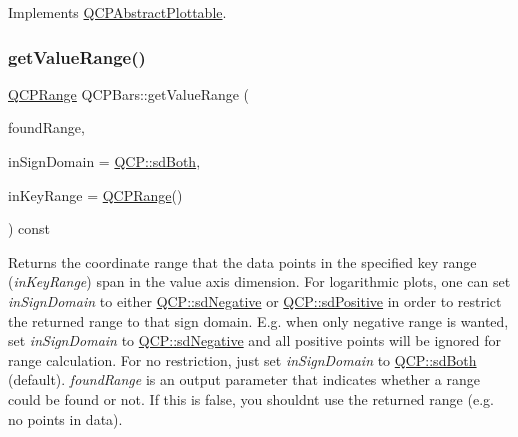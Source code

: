 Implements \hyperlink{classQCPAbstractPlottable_a4da16d3cd4b509e1104a9b0275623c96}{Q\+C\+P\+Abstract\+Plottable}.

\mbox{\label{classQCPBars_a02cee4bf94d48a1e5f6fc185d9a10477}} 
\subsubsection{\texorpdfstring{get\+Value\+Range()}{getValueRange()}}
{\footnotesize\ttfamily \hyperlink{classQCPRange}{Q\+C\+P\+Range} Q\+C\+P\+Bars\+::get\+Value\+Range (\begin{DoxyParamCaption}\item[{bool \&}]{found\+Range,  }\item[{\hyperlink{namespaceQCP_afd50e7cf431af385614987d8553ff8a9}{Q\+C\+P\+::\+Sign\+Domain}}]{in\+Sign\+Domain = {\ttfamily \hyperlink{namespaceQCP_afd50e7cf431af385614987d8553ff8a9aa38352ef02d51ddfa4399d9551566e24}{Q\+C\+P\+::sd\+Both}},  }\item[{const \hyperlink{classQCPRange}{Q\+C\+P\+Range} \&}]{in\+Key\+Range = {\ttfamily \hyperlink{classQCPRange}{Q\+C\+P\+Range}()} }\end{DoxyParamCaption}) const\hspace{0.3cm}{\ttfamily [virtual]}}

Returns the coordinate range that the data points in the specified key range ({\itshape in\+Key\+Range}) span in the value axis dimension. For logarithmic plots, one can set {\itshape in\+Sign\+Domain} to either \hyperlink{namespaceQCP_afd50e7cf431af385614987d8553ff8a9a2d18af0bc58f6528d1e82ce699fe4829}{Q\+C\+P\+::sd\+Negative} or \hyperlink{namespaceQCP_afd50e7cf431af385614987d8553ff8a9a584784b75fb816abcc627cf743bb699f}{Q\+C\+P\+::sd\+Positive} in order to restrict the returned range to that sign domain. E.\+g. when only negative range is wanted, set {\itshape in\+Sign\+Domain} to \hyperlink{namespaceQCP_afd50e7cf431af385614987d8553ff8a9a2d18af0bc58f6528d1e82ce699fe4829}{Q\+C\+P\+::sd\+Negative} and all positive points will be ignored for range calculation. For no restriction, just set {\itshape in\+Sign\+Domain} to \hyperlink{namespaceQCP_afd50e7cf431af385614987d8553ff8a9aa38352ef02d51ddfa4399d9551566e24}{Q\+C\+P\+::sd\+Both} (default). {\itshape found\+Range} is an output parameter that indicates whether a range could be found or not. If this is false, you shouldn\textquotesingle{}t use the returned range (e.\+g. no points in data).


